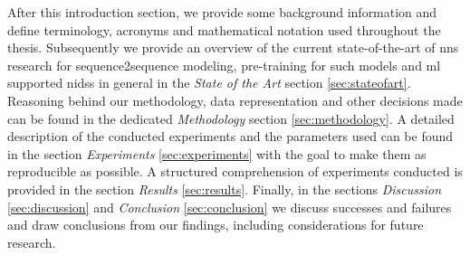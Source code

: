 After this introduction section, we provide some background information and define terminology, acronyms and mathematical notation used throughout the thesis. Subsequently we provide an overview of the current state-of-the-art of \glspl{nn} research for sequence2sequence modeling, pre-training for such models and \gls{ml} supported \glspl{nids} in general in the \textit{State of the Art} section \ref{sec:stateofart}. Reasoning behind our methodology, data representation and other decisions made can be found in the dedicated \textit{Methodology} section \ref{sec:methodology}. A detailed description of the conducted experiments and the parameters used can be found in the section \textit{Experiments} \ref{sec:experiments} with the goal to make them as reproducible as possible. A structured comprehension of experiments conducted is provided in the section \textit{Results} \ref{sec:results}. Finally, in the sections \textit{Discussion} \ref{sec:discussion} and \textit{Conclusion} \ref{sec:conclusion} we discuss successes and failures and draw conclusions from our findings, including considerations for future research. 


\newpage